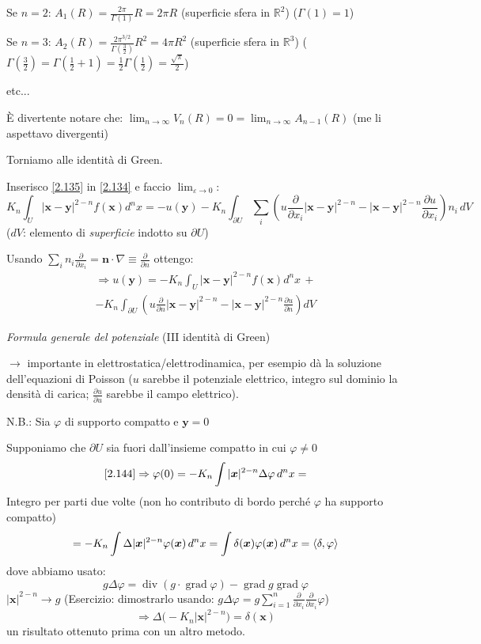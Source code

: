 \documentclass[a4paper,11pt]{report}
\newcommand{\vect}[1]{\boldsymbol{#1}}
\newcommand{\R}{\mathbb{R}}
\newcommand{\x}{\boldsymbol{x}}
\newcommand{\y}{\boldsymbol{y}}
\begin{document}
Se $n=2$: $A_1(R)=\frac{2\pi}{\Gamma(1)} R=2\pi R$ (superficie sfera in $\R^2$) ($\Gamma(1)=1$)

Se $n=3$: $A_2(R)=\frac{2\pi^{3/2}}{\Gamma\left(\frac{3}{2}\right)}R^2=4\pi R^2$ (superficie sfera in $\R^3$) ($\Gamma(\frac{3}{2})=\Gamma(\frac{1}{2}+1)=\frac{1}{2}\Gamma(\frac{1}{2})=\frac{\sqrt{\pi}}{2}$)

etc...

\`E divertente notare che: $\lim_{n\to \infty} V_n(R)=0=\lim_{n\to \infty}A_{n-1}(R)$ (me li aspettavo divergenti)

\medskip

Torniamo alle identit\`a di Green.

Inserisco \eqref{2.135} in \eqref{2.134} e faccio $\lim_{\varepsilon\to 0}$:
\[
K_n\int_U |\x - \y|^{2-n}f(\x)d^nx=-u(\y) - K_n\int_{\partial U}\sum_i \left(u\frac{\partial}{\partial x_i}|\x - \y|^{2-n} - |\x - \y|^{2-n} \frac{\partial u}{\partial x_i} \right)n_i \,dV
\]
($dV$: elemento di \emph{superficie} indotto su $\partial U$)

Usando $\sum_i n_i \frac{\partial}{\partial x_i}=\vect{n}\cdot\nabla\equiv\frac{\partial}{\partial n}$ ottengo:
\begin{multline}
\Rightarrow u(\y)=-K_n\int_U |\x - \y|^{2-n}f(\x) d^n x \,+\\
- K_n\int_{\partial U} \left(u\frac{\partial}{\partial n}|\x - \y|^{2-n} - |\x - \y|^{2-n} \frac{\partial u}{\partial n} \right)dV
\label{2.144}
\end{multline}
\centerline{\emph{Formula generale del potenziale} (III identit\`a di Green)}

\smallskip

$\rightarrow$ importante in elettrostatica/elettrodinamica, per esempio d\`a la soluzione dell'equazioni di Poisson ($u$ sarebbe il potenziale elettrico, integro sul dominio la densit\`a di carica; $\frac{\partial u}{\partial u}$ sarebbe il campo elettrico).

\medskip

N.B.: Sia $\varphi$ di supporto compatto e $\y=0$

Supponiamo che $\partial U$ sia fuori dall'insieme compatto in cui $\varphi \neq 0$
\[
\eqref{2.144} \Rightarrow \varphi(0)=-K_n\int |\x|^{2-n}\Delta \varphi \, d^n x=
\]
Integro per parti due volte (non ho contributo di bordo perch\'e $\varphi$ ha supporto compatto)
\[
=-K_n\int \Delta |\x|^{2-n} \varphi(\x) \, d^nx=\int \delta(\x)\varphi(\x) \, d^n x=\braket{\delta,\varphi}
\]
dove abbiamo usato:
\[
g\Delta\varphi=\operatorname{div} (g\cdot \operatorname{grad}\varphi)-\operatorname{grad} g \operatorname{grad} \varphi 
\]
$|\x|^{2-n} \rightarrow g$ (Esercizio: dimostrarlo usando: $g\Delta\varphi=g\sum_{i=1}^n \frac{\partial}{\partial x_i} \frac{\partial}{\partial x_i}\varphi$)
\begin{equation}
\Rightarrow \Delta\big(-K_n|\x|^{2-n}\big)=\delta(\x)
\label{2.145}
\end{equation}
un risultato ottenuto prima con un altro metodo.  %
\end{document}
